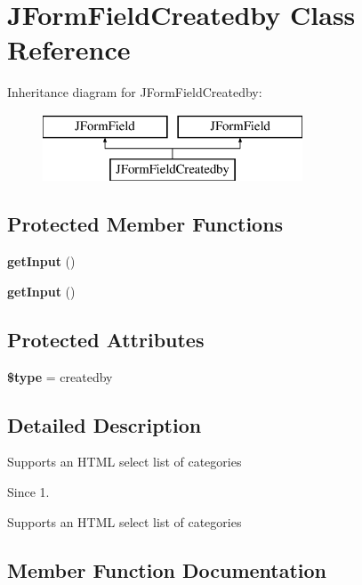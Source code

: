\section{J\+Form\+Field\+Createdby Class Reference}
\label{class_j_form_field_createdby}
Inheritance diagram for J\+Form\+Field\+Createdby\+:\begin{figure}[H]
\begin{center}
\leavevmode
\includegraphics[height=2.000000cm]{class_j_form_field_createdby}
\end{center}
\end{figure}
\subsection*{Protected Member Functions}
\begin{DoxyCompactItemize}
\item 
\textbf{ get\+Input} ()
\item 
\textbf{ get\+Input} ()
\end{DoxyCompactItemize}
\subsection*{Protected Attributes}
\begin{DoxyCompactItemize}
\item 
\textbf{ \$type} = \textquotesingle{}createdby\textquotesingle{}
\end{DoxyCompactItemize}


\subsection{Detailed Description}
Supports an H\+T\+ML select list of categories

\begin{DoxySince}{Since}
1.
\end{DoxySince}
Supports an H\+T\+ML select list of categories 

\subsection{Member Function Documentation}
\mbox{\label{class_j_form_field_createdby_a4380f30ae9202fa49ebd2439572f9cdb}} 
